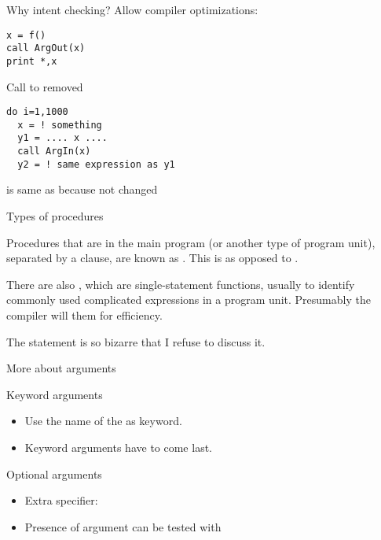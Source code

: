 \begin{block}{Why intent checking?}
\label{sl:intentwhy}
Allow compiler optimizations:

\begin{multicols}{2}
\begin{verbatim}
x = f()
call ArgOut(x)
print *,x
\end{verbatim}
Call to  removed
\vfill\columnbreak
\begin{verbatim}
do i=1,1000
  x = ! something
  y1 = .... x ....
  call ArgIn(x)
  y2 = ! same expression as y1
\end{verbatim}
 is same as  because  not changed
\end{multicols}

\end{block}

 {Types of procedures}

Procedures that are in the main program (or another type of program
unit), separated by a  clause, are known as
. This is as opposed to
.

There are also , which are
single-statement functions, usually to identify commonly used
complicated expressions in a program unit. Presumably the compiler
will  them for efficiency.

The  statement is so bizarre that I refuse to discuss it.

 {More about arguments}

\begin{block}{Keyword arguments}
  \label{sl:funcf:keyword}
  \begin{itemize}
  \item Use the name of the  as
    keyword.
  \item Keyword arguments have to come last.
  \end{itemize}
\end{block}

\begin{block}{Optional arguments}
  \label{sl:funcf:optional}
  \begin{itemize}
  \item Extra specifier: 
  \item Presence of argument can be tested with 
  \end{itemize}
\end{block}

